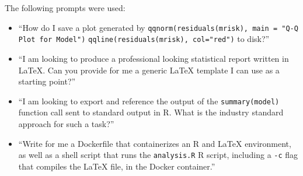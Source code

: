 \documentclass[12pt, a4paper]{article}
\begin{document}
The following prompts were used:
\begin{itemize}
    \item ``How do I save a plot generated by \texttt{qqnorm(residuals(mrisk), main = "Q-Q Plot for Model")} \texttt{qqline(residuals(mrisk), col="red")} to disk?''
 
    \item ``I am looking to produce a professional looking statistical report written in LaTeX. Can you provide for me a generic LaTeX template I can use as a starting point?''
 
    \item ``I am looking to export and reference the output of the \texttt{summary(model)} function call sent to standard output in R. What is the industry standard approach for such a task?''
 
    \item ``Write for me a Dockerfile that containerizes an R and LaTeX environment, as well as a shell script that runs the \texttt{analysis.R} R script, including a \texttt{-c} flag that compiles the LaTeX file, in the Docker container.''
\end{itemize}
 


 
\end{document}
